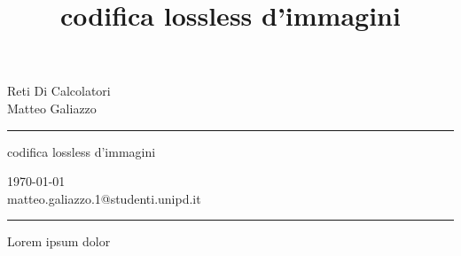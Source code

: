 \documentclass[a4paper,10pt]{article} %
\begin{document}

\title{codifica lossless d'immagini} %
\fancyhead[C]{}
\begin{minipage}{0.295\textwidth} %
\raggedright
Reti Di Calcolatori\\ %
\footnotesize %
Matteo Galiazzo %
\medskip\hrule
\end{minipage}
\begin{minipage}{0.4\textwidth} %
\centering 
\large %
codifica lossless d'immagini %
\end{minipage}
\begin{minipage}{0.295\textwidth} %
\raggedleft
\today\\ %
\footnotesize %
matteo.galiazzo.1@studenti.unipd.it%
\medskip
\hrule
\end{minipage}


\bigskip
\begin{flushleft}

Lorem ipsum dolor

\end{flushleft}%
\end{document}

